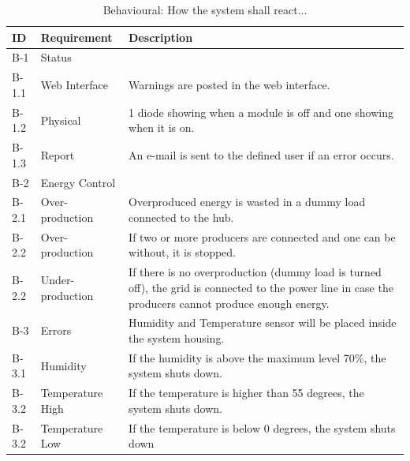 \begin{table}[H]
	\begin{tabular} [b] {| p{1.2cm} |  p{3.5cm} | p{11.3cm} |}
	\hline
	\textbf{ID} & \textbf{Requirement} & \textbf{Description} \\ \hline
		B-1 	&  Status 			&  \\ \hline
		B-1.1 & Web Interface	& Warnings are posted in the web interface. \\\hline
		B-1.2 & Physical		& 1 diode showing when a module is off and one showing when it is on.\\ \hline
		B-1.3 & Report			& An e-mail is sent to the defined user if an error occurs. \\\hline
		B-2 & Energy Control	&  \\\hline
		B-2.1 & Over-production	& Overproduced energy is wasted in a dummy load connected to the hub. \\\hline
		B-2.2 & Over-production	& If two or more producers are connected and one can be without, it is stopped.  \\\hline
		B-2.2 & Under-production	& If there is no overproduction (dummy load is turned off), the grid is connected to the power line in case the producers cannot produce enough energy. \\\hline
		B-3 & Errors	 		& Humidity and Temperature sensor will be placed inside the system housing. \\\hline
		B-3.1 & Humidity		& If the humidity is above the maximum level 70\%, the system shuts down. \\\hline
		B-3.2 & Temperature High& If the temperature is higher than 55 degrees,  the system shuts down.\\\hline
		B-3.2 & Temperature Low & If the temperature is below 0 degrees, the system shuts down\\\hline
	\end{tabular}
	\caption{Behavioural: How the system shall react...}
\end{table}

